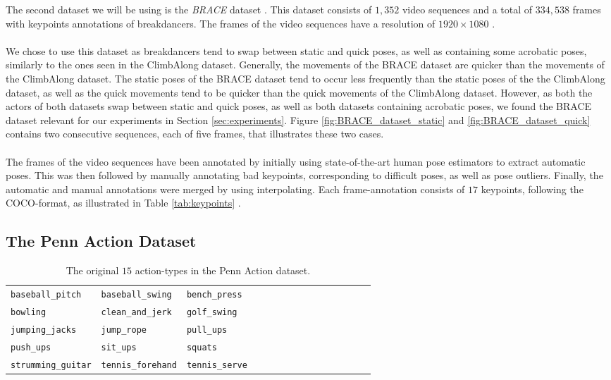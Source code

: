 \documentclass[./main.tex]{subfiles}
\begin{document}
\noindent The second dataset we will be using is the \textit{BRACE} dataset \cite{BRACE}. This dataset consists of $1,352$ video sequences and a total of $334,538$ frames with keypoints annotations of breakdancers. The frames of the video sequences have a resolution of $1920 \times 1080$ \cite{BRACE}.
\\
\\
We chose to use this dataset as breakdancers tend to swap between static and quick poses, as well as containing some acrobatic poses, similarly to the ones seen in the ClimbAlong dataset. Generally, the movements of the BRACE dataset are quicker than the movements of the ClimbAlong dataset. The static poses of the BRACE dataset tend to occur less frequently than the static poses of the the ClimbAlong dataset, as well as the quick movements tend to be quicker than the quick movements of the ClimbAlong dataset. However, as both the actors of both datasets swap between static and quick poses, as well as both datasets containing acrobatic poses, we found the BRACE dataset relevant for our experiments in Section \ref{sec:experiments}. Figure \ref{fig:BRACE_dataset_static} and \ref{fig:BRACE_dataset_quick} contains two consecutive sequences, each of five frames, that illustrates these two cases.
\\
\\
The frames of the video sequences have been annotated by initially using state-of-the-art human pose estimators to extract automatic poses. This was then followed by manually annotating bad keypoints, corresponding to difficult poses, as well as pose outliers. Finally, the automatic and manual annotations were merged by using interpolating. Each frame-annotation consists of $17$ keypoints, following the COCO-format, as illustrated in Table \ref{tab:keypoints} \cite{BRACE}.

\subsection{The Penn Action Dataset}
\label{sec:PA}
\begin{table}
    \begin{tabular}[htbp]{lllllllllllllll}
        \texttt{baseball\_pitch} & \texttt{baseball\_swing} & \texttt{bench\_press} \\
        \texttt{bowling} & \texttt{clean\_and\_jerk} & \texttt{golf\_swing} \\
        \texttt{jumping\_jacks} & \texttt{jump\_rope} & \texttt{pull\_ups} \\
        \texttt{push\_ups} & \texttt{sit\_ups} & \texttt{squats} \\
        \texttt{strumming\_guitar} & \texttt{tennis\_forehand} & \texttt{tennis\_serve}
    \end{tabular}
    \caption{The original $15$ action-types in the Penn Action dataset.}
    \label{tab:PA_actions}
\end{table}
\end{document}
